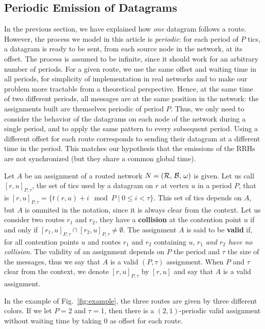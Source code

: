 \documentclass[a4paper,10pt]{article}
\begin{document}
 	\subsection{Periodic Emission of Datagrams}

	In the previous section, we have explained how \emph{one} datagram follows a route.
	However, the process we model in this article is \emph{periodic}: for each period of $P$ tics, a datagram is ready to be sent, from each source node in the network, at its offset. The process is assumed to be infinite, since it should work for an arbitrary number of periods. For a given route, we use the same offset and waiting time in all periods, for simplicity of implementation in real networks and to make our problem more tractable from a theoretical perspective. Hence, at the same time of two different periods, all messages are at the same position in the network: the assignments built are themselves periodic of period $P$. Thus, we only need to consider the behavior of the datagrams on each node of the network during a single period, and to apply the same pattern to every subsequent period. 
 	Using a different offset for each route corresponds to sending their datagram at a different time in the period. This matches our hypothesis that the emissions of the RRHs are not synchronized (but they share a common global time).

 	Let $A$ be an assignment of a routed network $N = (\cal{R},\,\cal{B},\,\omega)$ is given.
    Let us call $[r,u]_{P,\tau}$, the set of tics used by a datagram on $r$ at vertex $u$ in a period $P$, that is $[r,u]_{P,\tau} = \{t(r,u) + i \mod P \mid 0 \leq i < \tau \}$. This set of tics depends on $A$,
    but $A$ is ommited in the notation, since it is always clear from the context.
    Let us consider two routes $r_1$ and $r_2$, they have a {\bf collision} at the contention point $u$ if and only if $[r_1,u]_{P,\tau} \cap [r_2,u]_{P,\tau} \neq \emptyset$.
    The assignment $A$ is said to be \textbf{valid} if, for all contention points $u$ and routes $r_1$ and $r_2$ containing $u$, \emph{$r_1$ and $r_2$ have no collision}. 
    The validity of an assignment depends on $P$ the period and $\tau$ the size of the messages,
    thus we say that $A$ is a valid $(P,\tau)$ assignment. When $P$ and $\tau$ clear from the context, 
    we denote $[r,u]_{P,\tau}$ by $[r,u]$ and say that $A$ is a valid assignment. 

     In the example of Fig.~\ref{fig:example}, the three routes are given by three different colors. If we let $P = 2$ and $\tau = 1$, then there is a $(2,1)$-periodic valid assignment without waiting time by taking $0$ as offset for each route.
\end{document}
